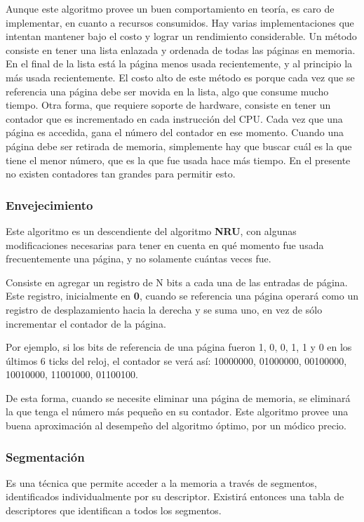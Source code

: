 \documentclass[10pt,a4paper]{article}
\begin{document}
Aunque este algoritmo provee un buen comportamiento en teoría, es caro de implementar, en cuanto a recursos consumidos. Hay varias implementaciones que intentan mantener bajo el costo y lograr un rendimiento considerable. Un método consiste en tener una lista enlazada y ordenada de todas las páginas en memoria. En el final de la lista está la página menos usada recientemente, y al principio la más usada recientemente. El costo alto de este método es porque cada vez que se referencia una página debe ser movida en la lista, algo que consume mucho tiempo. Otra forma, que requiere soporte de hardware, consiste en tener un contador que es incrementado en cada instrucción del CPU. Cada vez que una página es accedida, gana el número del contador en ese momento. Cuando una página debe ser retirada de memoria, simplemente hay que buscar cuál es la que tiene el menor número, que es la que fue usada hace más tiempo. En el presente no existen contadores tan grandes para permitir esto.

\subsubsection{Envejecimiento}
Este algoritmo es un descendiente del algoritmo \textbf{NRU}, con algunas modificaciones necesarias para tener en cuenta en qué momento fue usada frecuentemente una página, y no solamente cuántas veces fue.

Consiste en agregar un registro de N bits a cada una de las entradas de página. Este registro, inicialmente en \textbf{0}, cuando se referencia una página operará como un registro de desplazamiento hacia la derecha y se suma uno, en vez de sólo incrementar el contador de la página.

Por ejemplo, si los bits de referencia de una página fueron 1, 0, 0, 1, 1 y 0 en los últimos 6 ticks del reloj, el contador se verá así: 10000000, 01000000, 00100000, 10010000, 11001000, 01100100.

De esta forma, cuando se necesite eliminar una página de memoria, se eliminará la que tenga el número más pequeño en su contador. Este algoritmo provee una buena aproximación al desempeño del algoritmo óptimo, por un módico precio.

\subsubsection{Segmentación}
Es una técnica que permite acceder a la memoria a través de segmentos, identificados individualmente por su descriptor. Existirá entonces una tabla de descriptores que identifican a todos los segmentos.
\end{document}
